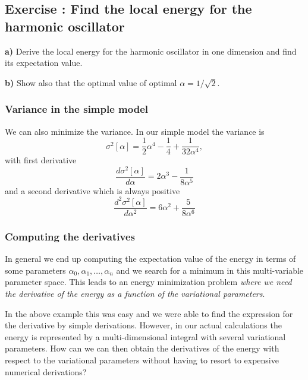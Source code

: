 \documentclass{beamer}
\newenvironment{doconceexercise}{}{}
\newcounter{doconceexercisecounter}
\newcounter{doconce:movie:counter}
\newcommand{\subex}[1]{\noindent\textbf{#1}}  %
\begin{document}
\begin{frame}

\begin{doconceexercise}

\subsection*{Exercise \thedoconceexercisecounter: Find the local energy for the harmonic oscillator}



\subex{a)}
Derive the local energy for the harmonic oscillator in one dimension and find its expectation value.

\subex{b)}
Show also that the optimal value of optimal $\alpha=1/\sqrt{2}$.


\end{doconceexercise}
\end{frame}

\begin{frame}
\frametitle{Variance in the simple model}

\begin{block}{}
We can also minimize the variance. In our simple model the variance is
\begin{equation*}
\sigma^2[\alpha] = \frac{1}{2}\alpha^4-\frac{1}{4}+\frac{1}{32\alpha^4},
\end{equation*}
with first derivative
\begin{equation*}
\frac{d \sigma^2[\alpha]}{d\alpha} = 2\alpha^3-\frac{1}{8\alpha^5}
\end{equation*}
and a second derivative which is always positive
\begin{equation*}
\frac{d^2\sigma^2[\alpha]}{d\alpha^2} = 6\alpha^2+\frac{5}{8\alpha^6}
\end{equation*}
\end{block}
\end{frame}

\begin{frame}
\frametitle{Computing the derivatives}

\begin{block}{}
In general we end up computing the expectation value of the energy in terms 
of some parameters $\alpha_0,\alpha_1,\dots,\alpha_n$
and we search for a minimum in this multi-variable parameter space.  
This leads to an energy minimization problem \emph{where we need the derivative of the energy as a function of the variational parameters}.

In the above example this was easy and we were able to find the expression for the derivative by simple derivations. 
However, in our actual calculations the energy is represented by a multi-dimensional integral with several variational parameters.
How can we can then obtain the derivatives of the energy with respect to the variational parameters without having 
to resort to expensive numerical derivations? 

\end{block}
\end{frame}
\end{document}
